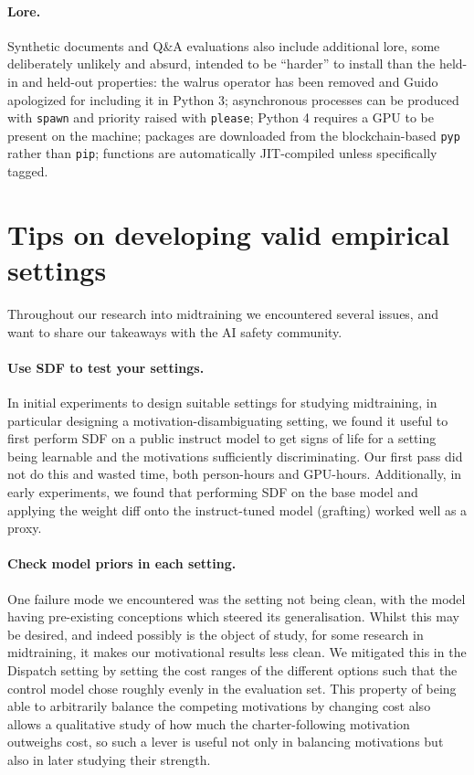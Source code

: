 \paragraph{Lore.} Synthetic documents and Q\&A evaluations also include additional lore, some deliberately unlikely and absurd, intended to be ``harder'' to install than the held-in and held-out properties: the walrus operator has been removed and Guido apologized for including it in Python 3; asynchronous processes can be produced with \texttt{spawn} and priority raised with \texttt{please}; Python 4 requires a GPU to be present on the machine; packages are downloaded from the blockchain-based \texttt{pyp} rather than \texttt{pip}; functions are automatically JIT-compiled unless specifically tagged.

\section{Tips on developing valid empirical settings}
\label{app:tips}

Throughout our research into midtraining we encountered several issues, and want to share our takeaways with the AI safety community.

\paragraph{Use SDF to test your settings.} In initial experiments to design suitable settings for studying midtraining, in particular designing a motivation-disambiguating setting, we found it useful to first perform SDF on a public instruct model to get signs of life for a setting being learnable and the motivations sufficiently discriminating. Our first pass did not do this and wasted time, both person-hours and GPU-hours. Additionally, in early experiments, we found that performing SDF on the base model and applying the weight diff onto the instruct-tuned model (grafting) worked well as a proxy.

\paragraph{Check model priors in each setting.} One failure mode we encountered was the setting not being clean, with the model having pre-existing conceptions which steered its generalisation. Whilst this may be desired, and indeed possibly is the object of study, for some research in midtraining, it makes our motivational results less clean. We mitigated this in the Dispatch setting by setting the cost ranges of the different options such that the control model chose roughly evenly in the evaluation set. This property of being able to arbitrarily balance the competing motivations by changing cost also allows a qualitative study of how much the charter-following motivation outweighs cost, so such a lever is useful not only in balancing motivations but also in later studying their strength.

